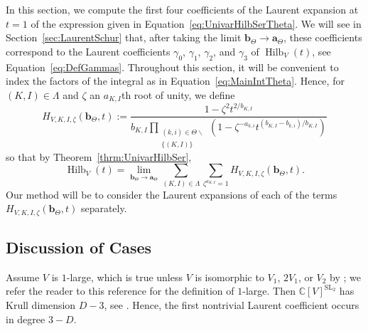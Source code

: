 \documentclass{amsart}
\theoremstyle{definition}
\theoremstyle{remark}
\newcommand{\C}{\mathbb{C}}
\newcommand{\SL}{\operatorname{SL}}
\newcommand{\bs}{\boldsymbol}
\newcommand{\Hilb}{\operatorname{Hilb}}
\begin{document}
In this section, we compute the first four coefficients of the Laurent expansion at $t = 1$ of the
expression given in Equation~\eqref{eq:UnivarHilbSerTheta}. We will see in Section~\ref{sec:LaurentSchur} that,
after taking the limit $\bs{b}_\Theta\to\bs{a}_\Theta$, these coefficients correspond to the Laurent
coefficients $\gamma_0$, $\gamma_1$, $\gamma_2$, and $\gamma_3$ of $\Hilb_V(t)$, see Equation~\eqref{eq:DefGammas}.
Throughout this section, it will be convenient to index the factors of the integral as in
Equation~\eqref{eq:MainIntTheta}. Hence, for $(K,I)\in\Lambda$ and $\zeta$ an $a_{K,I}$th root
of unity, we define
\begin{equation}
\label{eq:DefH}
    H_{V,K,I,\zeta}(\bs{b}_\Theta,t):=   \frac{ 1 - \zeta^2 t^{2/b_{K,I}}}
    {b_{K,I} \prod\limits_{\substack{(k,i)\in\Theta\smallsetminus \\ \{(K,I)\}}}
            (1 - \zeta^{-a_{k,i}} t^{(b_{K,I}-b_{k,i})/b_{K,I}})
            }
\end{equation}
so that by Theorem~\ref{thrm:UnivarHilbSer},
\begin{equation}
\label{eq:DefH2}
    \Hilb_V(t)  =   \lim\limits_{\bs{b}_\Theta\to\bs{a}_\Theta}
        \sum\limits_{(K,I)\in\Lambda} \sum\limits_{\zeta^{a_{K,I}} = 1}
        H_{V,K,I,\zeta}(\bs{b}_\Theta,t).
\end{equation}
Our method will be to consider the Laurent expansions of each of the terms
$H_{V,K,I,\zeta}(\bs{b}_\Theta,t)$ separately.


\subsection{Discussion of Cases}
\label{subsec:LaurentCases}

Assume $V$ is $1$-large, which is true unless $V$ is isomorphic to $V_1$, $2V_1$, or $V_2$ by
\cite[Theorem 3.4]{HerbigSchwarz}; we refer the reader to this reference for the definition
of $1$-large. Then $\C[V]^{\SL_2}$ has Krull dimension $D - 3$,
see \cite[Remark 9.2(3)]{GWSlifting}. Hence, the first nontrivial Laurent coefficient occurs in
degree $3-D$.
\end{document}
